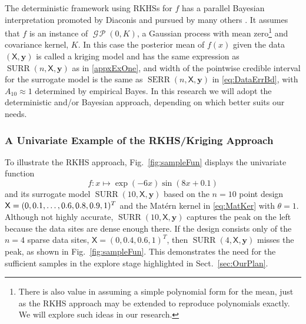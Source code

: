 \documentclass[11pt]{NSFamsart}
\DeclareMathOperator{\GP}{\mathcal{G} \! \mathcal{P}}
\DeclareMathOperator{\SURR}{SURR}
\DeclareMathOperator{\SURRERR}{SERR}
\newcommand{\mX}{\mathsf{X}}
\newcommand{\by}{{\boldsymbol{y}}}
\begin{document}
The deterministic framework using RKHSs for $f$ has a parallel Bayesian interpretation promoted by Diaconis \cite{Dia88a} and pursued by many others \cite{BriEtal18a, OHa91a, OwhEtal19a, RasWil06a, Rit00a}.  It assumes that $f$ is an instance of $\GP(0,K)$, a Gaussian process with mean zero\footnote{There is also value in assuming a simple polynomial form for the mean, just as the RKHS approach may be extended to reproduce polynomials exactly. We will explore such ideas in our research.} and covariance kernel, $K$.  In this case the posterior mean of $f(x)$ given the data $(\mX,\by)$ is called a kriging model and has the same expression as $\SURR(n,\mX,\by)$ as in \eqref{appxExOne}, and width of the pointwise credible interval for the surrogate model is the same as $\SURRERR(n,\mX,\by)$ in \eqref{eq:DataErrBd}, with $A_{10} \approx 1$ determined by empirical Bayes.  In this research we will adopt the deterministic and/or Bayesian approach, depending on which better suits our needs.

\subsubsection{A Univariate Example of the RKHS/Kriging Approach} \label{sec:UnivarEx}

To illustrate the RKHS approach, Fig.\ \ref{fig:sampleFun} displays the univariate function
\begin{equation} \label{eq:univarfun}
f \colon x \mapsto \exp(-6x) \sin(8x+0.1)
\end{equation}
and its surrogate model $\SURR(10,\mX,\by)$ based on the $n=10$ point design $\mX = (0, 0.1, \ldots, 0.6, 0.8,\linebreak 0.9, 1)^T$ and the Mat\'ern kernel in \eqref{eq:MatKer} with $\theta =1$.  
Although not highly accurate, $\SURR(10,\mX,\by)$ captures the peak on the left because the data sites are dense enough there.  If the design consists only of the $n=4$ sparse data sites, $\mX = (0, 0.4,  0.6, 1)^T$, then $\SURR(4,\mX,\by)$ misses the peak, as shown in Fig.\ \ref{fig:sampleFun}. This demonstrates the need for the sufficient samples in the explore stage highlighted in Sect.\ \ref{sec:OurPlan}. 
\end{document}
